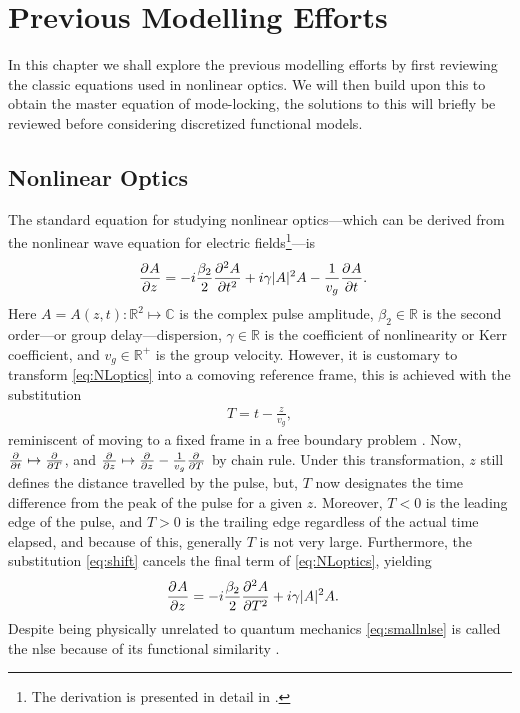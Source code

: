 
\chapter{Previous Modelling Efforts}
In this chapter we shall explore the previous modelling efforts by first reviewing the classic equations used in nonlinear optics. We will then build upon this to obtain the master equation of mode-locking, the solutions to this will briefly be reviewed before considering discretized functional models.

\section{Nonlinear Optics}
The standard equation for studying nonlinear optics---which can be derived from the nonlinear wave equation for electric fields\footnote{The derivation is presented in detail in \cite{agrawal2013, ferreira}.}---is
\begin{align}
\pdiff{A}{z} &= - i \frac{\beta_2}{2}\pdiff[2]{A}{t} + i \gamma |A|^2 A - \frac{1}{v_g} \pdiff{A}{t}.
\label{eq:NLoptics}
\end{align}
Here $A = A(z, t) : \mathbb{R}^2 \mapsto \mathbb{C}$ is the complex pulse amplitude, $\beta_2 \in \mathbb{R}$ is the second order---or group delay---dispersion, $\gamma \in \mathbb{R}$ is the coefficient of nonlinearity or Kerr coefficient, and $v_g \in \mathbb{R}^+$ is the group velocity. However, it is customary to transform \eqref{eq:NLoptics} into a comoving reference frame, this is achieved with the substitution
\begin{align}
\label{eq:shift}
T = t - \frac{z}{v_g},
\end{align}
reminiscent of moving to a fixed frame in a free boundary problem \cite{ockendon}. Now, $\frac{\partial^{}}{\partial{t}^{}} \mapsto \frac{\partial^{}}{\partial{T}^{}}$, and $\frac{\partial^{}}{\partial{z}^{}} \mapsto \frac{\partial^{}}{\partial{z}^{}} - \frac{1}{v_g} \frac{\partial^{}}{\partial{T}^{}}$ by chain rule.  Under this transformation, $z$ still defines the distance travelled by the pulse, but, $T$ now designates the time difference from the peak of the pulse for a given $z$. Moreover, $T < 0$ is the leading edge of the pulse, and $T > 0$ is the trailing edge regardless of the actual time elapsed, and because of this, generally $T$ is not very large. Furthermore, the substitution \eqref{eq:shift} cancels the final term of \eqref{eq:NLoptics}, yielding
\begin{align}
\pdiff{A}{z} &= - i \frac{\beta_2}{2}\pdiff[2]{A}{T} + i \gamma |A|^2 A.
\label{eq:smallnlse}
\end{align}
Despite being physically unrelated to quantum mechanics \eqref{eq:smallnlse} is called the \gls{nlse} because of its functional similarity \cite{agrawal2013, anderson, burgoyne2007, desurvire, ferreira, finot, rothenberg}. \\

